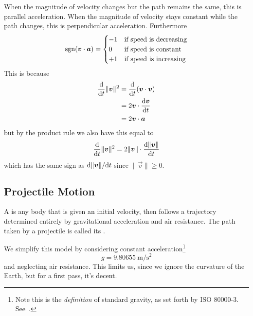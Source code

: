 When the magnitude of velocity changes but the path remains the same,
this is parallel acceleration. When the magnitude of velocity stays
constant while the path changes, this is perpendicular
acceleration. Furthermore
\begin{equation}
\sgn(\vec{v}\cdot\vec{a})=\begin{cases}
-1 & \mbox{if speed is decreasing}\\
0 & \mbox{if speed is constant}\\
+1 & \mbox{if speed is increasing}
\end{cases}
\end{equation}
This is because
\begin{equation}
\begin{split}
\frac{\D}{\D t}\|\vec{v}\|^{2}
&=\frac{\D}{\D t}(\vec{v}\cdot\vec{v})\\
&=2\vec{v}\cdot\frac{\D\vec{v}}{\D t}\\
&=2\vec{v}\cdot\vec{a}
\end{split}
\end{equation}
but by the product rule we also have this equal to
\begin{equation}
\frac{\D}{\D t}\|\vec{v}\|^{2}=2\|\vec{v}\|\cdot\frac{\D\|\vec{v}\|}{\D t}
\end{equation}
which has the same sign as $\D\|\vec{v}\|/\D t$ since
$\|\vec{v}\|\geq0$.



\subsection{Projectile Motion}
A  is any body that is given an initial velocity,
then follows a trajectory determined entirely by gravitational
acceleration and air resistance. The path taken by a projectile is
called its .

\begin{remark}
We simplify this model by considering constant
acceleration\footnote{Note this is the \emph{definition} of standard
  gravity, as set forth by ISO 80000-3. See~\cite[p 52]{sp330}.}
\begin{equation}
g=\SI{9.80655}{\meter/\square\second}
\end{equation}
and neglecting air resistance. This limits us, since we ignore the
curvature of the Earth, but for a first pass, it's decent.
\end{remark}

